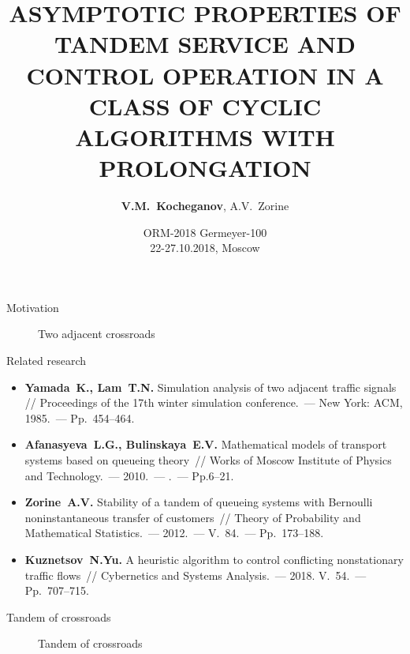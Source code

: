 \documentclass[10pt]{beamer}
\newcommand{\No}{\textnumero}
\begin{document}
\title[ASYMPTOTIC PROPERTIES OF ...]{\normalsize \color{blue} \MakeUppercase{Asymptotic properties of tandem service and control operation in a class of cyclic algorithms with prolongation}}

\author[V.M.~Kocheganov, A.V.~Zorine (NNSU)]{\textbf{V.M.~Kocheganov}, A.V.~Zorine}
\date[25-29.09.2017]{
ORM-2018 Germeyer-100 \\ 
 22-27.10.2018, Moscow
}

\begin{frame}
\titlepage
\end{frame}

\begin{frame}{Motivation}
      \begin{figure}[h]
    \centering
    \caption{Two adjacent crossroads}
    \label{VK:fig:1}
  \end{figure}
\end{frame}

\begin{frame}{Related research}
    \begin{itemize}
    \item \textbf{Yamada~K., Lam~T.N.} Simulation analysis of two adjacent traffic signals // Proceedings of the 17th winter simulation conference.~--- New York: ACM, 1985.~--- Pp.~454--464.
    \item \textbf{Afanasyeva~L.G., Bulinskaya~E.V. } Mathematical models of transport systems based on queueing theory~// Works of Moscow Institute of Physics and Technology.~--- 2010.~--- \No{4}.~--- Pp.6--21. 
\item \textbf{Zorine~A.V.} Stability of a tandem of queueing systems with Bernoulli noninstantaneous transfer of  customers~// Theory of Probability and Mathematical Statistics.~--- 2012.~--- V.~84.~--- Pp.~173--188.
\item \textbf{Kuznetsov~N.Yu.} A heuristic algorithm to control conflicting nonstationary traffic flows~// Cybernetics and Systems Analysis.~--- 2018. V.~54.~--- Pp.~707--715.
    \end{itemize}
\end{frame}


\begin{frame}{Tandem of crossroads }
  \begin{figure}[h]
    \centering
    \caption{Tandem of crossroads }
    \label{VK:fig:1}
  \end{figure}
\end{frame} 
\end{document}
